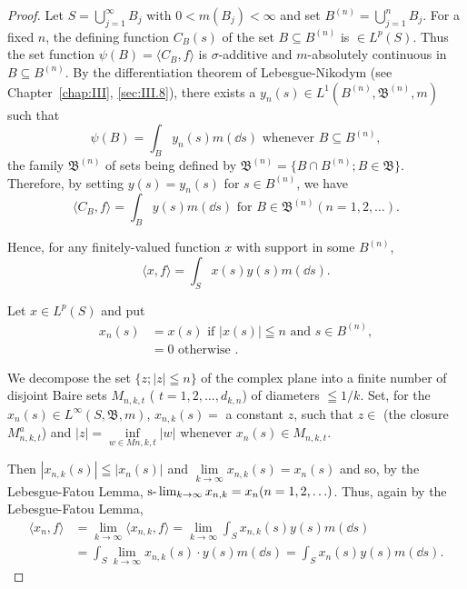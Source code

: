 \begin{proof}
 Let $S = \bigcup\limits_{j=1}^{\infty} B_j$ with $0 < m(B_j) < \infty$ and set $B^{(n)} = \bigcup\limits_{j=1}^{n} B_j$. For a fixed $n$, the defining function $C_B(s)$ of the set $B \subseteq B^{(n)}$ is $\in L^p(S)$. Thus the set function $\psi(B) = \langle C_B, f \rangle$ is $\sigma$-additive and $m$-absolutely continuous in $B \subseteq B^{(n)}$. By the differentiation theorem of Lebesgue-Nikodym (see Chapter~\ref{chap:III}, \ref{sec:III.8}), there exists a $y_n(s) \in L^1(B^{(n)}, \mathfrak{B}^{(n)}, m)$ such that 
\[
\psi (B) = \int_{B} y _{n} (s) m (\dd s) \text{ whenever } B \subseteq B ^{(n)},
\]
the family $\mathfrak{B}^{(n)}$ of sets being defined by $\mathfrak{B}^{(n)} = \{B \cap B^{(n)}; B \in \mathfrak{B}\}$. Therefore, by setting $y(s) = y_n(s)$ for $s \in B^{(n)}$, we have 
\[
\langle C _{B}, f \rangle = \int_{B} y (s) m (\dd s) \text{ for } B \in \mathfrak {B} ^{(n)} (n = 1, 2, \dots). \]

Hence, for any finitely-valued function $x$ with support in some $B^{(n)}$, 
\begin{equation}\label{eq:IV.9.4}
\langle x, f \rangle = \int_{S} x (s) y (s) m (\dd s).
\end{equation}

Let $x \in L^{p}(S)$ and put 
\[
\begin{aligned} x _{n} (s) & = x (s) \text{ if } | x (s) | \leqq n \text{ and } s \in B ^{(n)}, \\ & = 0 \text{ otherwise }. \end{aligned}
\]

We decompose the set $\{z; |z| \leqq n\}$ of the complex plane into a finite number of disjoint Baire sets $M_{n,k,t}$ ( $t = 1, 2, \ldots, d_{k,n}$) of diameters $\leqq 1/k$. Set, for the $x_n(s) \in L^\infty(S, \mathfrak{B}, m)$, 
$x_{n,k}(s) =$ a constant $z$, such that $z\in$ (the closure $M_{n,k,t}^{a}$) and $|z| = \inf\limits_{w\in Mn,k,t}|w|$ whenever $x_{n}(s)\in M_{n,k,t}$. 

Then $|x_{n,k}(s)| \leqq |x_n(s)|$ and $\lim\limits_{k \to \infty} x_{n,k}(s) = x_n(s)$ and so, by the Lebesgue-Fatou Lemma, $\text{s-}\lim\nolimits_{k \to \infty} x_{n,k} = x_n (n = 1, 2, \ldots)$. Thus, again by the Lebesgue-Fatou Lemma, 
\begin{equation}\label{eq:IV.9.5}
\begin{aligned} \langle x _{n}, f \rangle & = \lim\limits _{k \to \infty} \langle x _{n,k}, f \rangle = \lim\limits _{k \to \infty} \int_{S} x _{n,k} (s) y (s) m (\dd s) \\ & = \int_{S} \lim\limits _{k \to \infty} x _{n,k} (s) \cdot y (s) m (\dd s) = \int_{S} x _{n} (s) y (s) m (\dd s). \end{aligned}
\end{equation}


\end{proof}
